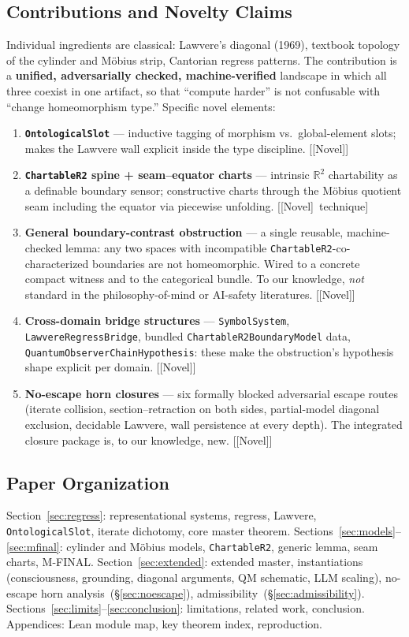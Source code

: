 \documentclass[11pt]{article}
\newcommand{\novel}{\textcolor{blue!70!black}{[Novel]}}
\begin{document}
\subsection{Contributions and Novelty Claims}

Individual ingredients are classical: Lawvere's diagonal (1969), textbook
topology of the cylinder and M\"obius strip, Cantorian regress patterns.
The contribution is a \textbf{unified, adversarially checked, machine-verified}
landscape in which all three coexist in one artifact, so that ``compute
harder'' is not confusable with ``change homeomorphism type.''  Specific
novel elements:

\begin{enumerate}[label=(\arabic*),itemsep=0.4ex]
\item \textbf{\texttt{OntologicalSlot}} --- inductive tagging of morphism
  vs.\ global-element slots; makes the Lawvere wall explicit inside the
  type discipline. [\novel]
\item \textbf{\texttt{ChartableR2} spine + seam--equator charts} ---
  intrinsic $\mathbb{R}^2$ chartability as a definable boundary sensor;
  constructive charts through the M\"obius quotient seam including the
  equator via piecewise unfolding. [\novel\ technique]
\item \textbf{General boundary-contrast obstruction} ---
  a single reusable, machine-checked lemma: any two spaces with
  incompatible \texttt{ChartableR2}-co-characterized boundaries are not
  homeomorphic.  Wired to a concrete compact witness and to the categorical
  bundle.  To our knowledge, \emph{not} standard in the philosophy-of-mind
  or AI-safety literatures. [\novel]
\item \textbf{Cross-domain bridge structures} ---
  \texttt{SymbolSystem}, \texttt{LawvereRegressBridge},
  bundled \texttt{ChartableR2BoundaryModel} data,
  \texttt{QuantumObserverChainHypothesis}: these make the obstruction's
  hypothesis shape explicit per domain. [\novel]
\item \textbf{No-escape horn closures} --- six formally blocked
  adversarial escape routes (iterate collision, section--retraction on
  both sides, partial-model diagonal exclusion, decidable Lawvere,
  wall persistence at every depth).  The integrated closure package is,
  to our knowledge, new. [\novel]
\end{enumerate}

\subsection{Paper Organization}
Section~\ref{sec:regress}: representational systems, regress, Lawvere,
\texttt{OntologicalSlot}, iterate dichotomy, core master theorem.
Sections~\ref{sec:models}--\ref{sec:mfinal}: cylinder and M\"obius models,
\texttt{ChartableR2}, generic lemma, seam charts, M-FINAL.
Section~\ref{sec:extended}: extended master, instantiations (consciousness,
grounding, diagonal arguments, QM schematic, LLM scaling), no-escape
horn analysis~(\S\ref{sec:noescape}), admissibility~(\S\ref{sec:admissibility}).
Sections~\ref{sec:limits}--\ref{sec:conclusion}: limitations, related work,
conclusion.
Appendices: Lean module map, key theorem index, reproduction.
\end{document}
